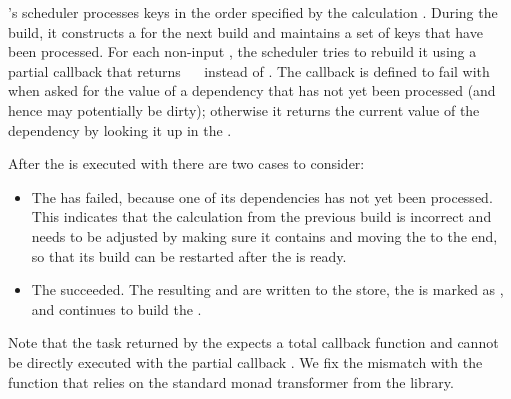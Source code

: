 \Excel's  scheduler processes keys in the order specified by the
calculation . During the build, it constructs a  for the
next build and maintains a set of keys  that have been processed. For
each non-input , the scheduler tries to rebuild it using a partial
 callback that returns ~~ instead of .
The callback is defined to fail with ~ when asked for the value
of a dependency  that has not yet been processed (and hence may
potentially be dirty); otherwise it returns the current value of the dependency
by looking it up in the .

After the  is executed with  there are two cases to
consider:

\begin{itemize}
    \item The  has failed, because one of its dependencies 
    has not yet been processed. This indicates that the calculation 
    from the previous build is incorrect and needs to be adjusted by making sure
    it contains  and moving the  to the end, so that its build
    can be restarted after the  is ready.
    \item The  succeeded. The resulting  and
     are written to the store, the  is marked as ,
    and \Excel continues to build the .
\end{itemize}

Note that the task returned by the  expects a total callback
function and cannot be directly executed with the partial callback .
We fix the mismatch with the function  that relies on the standard
monad transformer  from the  library.

